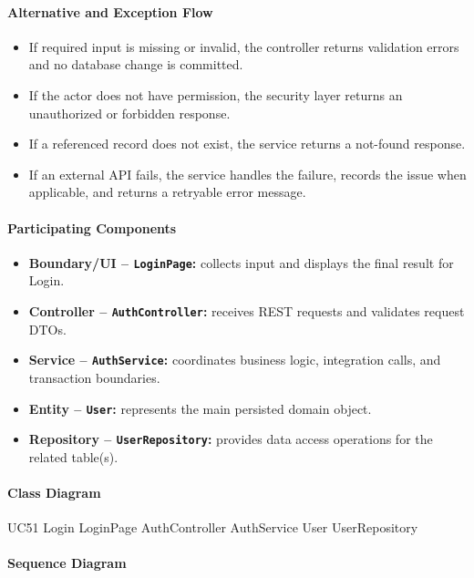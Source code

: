 \paragraph{Alternative and Exception Flow}

\begin{itemize}
    \item If required input is missing or invalid, the controller returns validation errors and no database change is committed.
    \item If the actor does not have permission, the security layer returns an unauthorized or forbidden response.
    \item If a referenced record does not exist, the service returns a not-found response.
    \item If an external API fails, the service handles the failure, records the issue when applicable, and returns a retryable error message.
\end{itemize}

\paragraph{Participating Components}

\begin{itemize}
    \item \textbf{Boundary/UI -- \texttt{LoginPage}:} collects input and displays the final result for Login.
    \item \textbf{Controller -- \texttt{AuthController}:} receives REST requests and validates request DTOs.
    \item \textbf{Service -- \texttt{AuthService}:} coordinates business logic, integration calls, and transaction boundaries.
    \item \textbf{Entity -- \texttt{User}:} represents the main persisted domain object.
    \item \textbf{Repository -- \texttt{UserRepository}:} provides data access operations for the related table(s).
\end{itemize}

\paragraph{Class Diagram}

\ClassDiagram
{UC51 Login}
{LoginPage}
{AuthController}
{AuthService}
{User}
{UserRepository}

\paragraph{Sequence Diagram}

